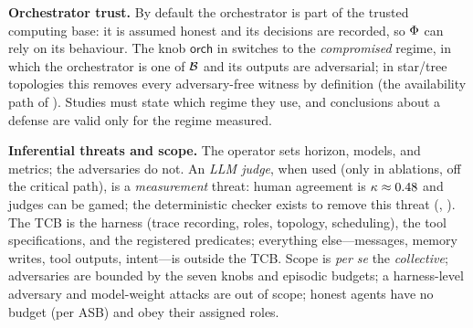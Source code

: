 \textbf{Orchestrator trust.} By default the orchestrator is part of the trusted computing
base: it is assumed honest and its decisions are recorded, so $\Phi$ can rely on its
behaviour. The knob $\mathsf{orch}$ in  switches to the \emph{compromised}
regime, in which the orchestrator is one of $\mathcal{B}$ and its outputs are adversarial;
in star/tree topologies this removes every adversary-free witness by definition (the
availability path of ). Studies must state which regime they use, and
conclusions about a defense are valid only for the regime measured.

\textbf{Inferential threats and scope.} The operator sets horizon, models, and metrics; the
adversaries do not. An \emph{LLM judge}, when used (only in ablations, off the critical
path), is a \emph{measurement} threat: human agreement is $\kappa\approx0.48$ and judges
can be gamed; the deterministic checker exists to remove this threat (,
). The TCB is the harness (trace recording, roles, topology,
scheduling), the tool specifications, and the registered predicates; everything
else---messages, memory writes, tool outputs, intent---is outside the TCB. Scope is
\emph{per se} the \emph{collective}; adversaries are bounded by the seven knobs and episodic
budgets; a harness-level adversary and model-weight attacks are out of scope; honest agents
have no budget (per ASB) and obey their assigned roles.